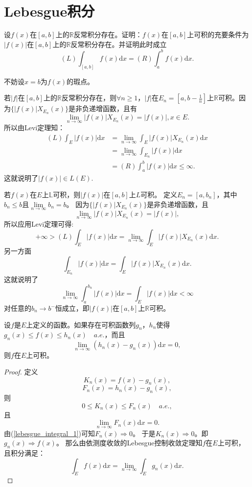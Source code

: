 \section{Lebesgue积分}

\begin{exercise}
设$f(x)$在$[a,b]$上的$\mathbb{R}$反常积分存在。证明：$f(x)$在$[a,b]$上可积的充要条件为$|f(x)|$在$[a,b]$上的$\mathbb{R}$反常积分存在。并证明此时成立$$(L)\int_{[a,b]}f(x)\mathrm{d}x=(R)\int_a^bf(x)\mathrm{d}x.$$


不妨设$x=b$为$f(x)$的瑕点。

若$|f|$在$[a,b]$上的$\mathbb{R}$反常积分存在，则$\forall n\geq1$，$|f|$在$E_n=[a,b-\frac{1}{n}]$上$\mathbb{R}$可积。因为$\{|f(x)|X_{E_n}(x)\}$是非负递增函数，且有$$\lim_{n\to\infty}|f(x)|X_{E_n}(x)=|f(x)|,x\in E.$$所以由Levi定理知：
\begin{align*}
(L)\int_E|f(x)|\mathrm{d}x&=\lim_{n\to\infty}\int_E|f(x)|X_{E_n}(x)\mathrm{d}x\\
&=\lim_{n\to\infty}\int_{E_n}|f(x)|\mathrm{d}x\\
&=(R)\int_a^b|f(x)|\mathrm{d}x
\leq\infty.
\end{align*}
这就说明了$|f(x)|\in L(E).$

若$f(x)$在$E$上$\mathbb{L}$可积，则$|f(x)|$在$[a,b]$上$L$可积。
定义$E_n=[a,b_n]$，其中$b_n\leq b$且$\lim\limits_{n\to\infty}b_n=b$。
因为$\{|f(x)|X_{E_n}(x)\}$是非负递增函数，且
$$\lim_{n\to\infty}|f(x)|X_{E_n}(x)=|f(x)|,$$
所以应用Levi定理可得:
$$+\infty>(L)\int_E|f(x)|\mathrm{d}x=\lim_{n\to\infty}\int_E|f(x)|X_{E_n}(x)\mathrm{d}x.$$
另一方面$$\int_{E_n}|f(x)|\mathrm{d}x=\int_E|f(x)|X_{E_n}(x)\mathrm{d}x.$$
这就说明了$$\lim_{n\to\infty}\int_a^{b_n}|f(x)|\mathrm{d}x=\int_E|f(x)|\mathrm{d}x<\infty$$
对任意的$b_n\to b^-$恒成立，即$|f(x)|$在$[a,b]$上$\mathbb{R}$可积。
\end{exercise}



\begin{exercise}
设$f$是$E$上定义的函数。如果存在可积函数列$g_n$，$h_n$使得$g_n(x)\leq f(x)\leq h_n(x)\quad a.e.$，而且
$$\lim_{n\to\infty}(h_n(x)-g_n(x))\mathrm{d}x=0,$$
则$f$在$E$上可积。
\end{exercise}

\begin{proof}
  定义$$K_n(x)=f(x)-g_n(x),$$
$$F_n(x)=h_n(x)-g_n(x),$$
则
$$0\leq K_n(x)\leq F_n(x)\quad a.e.,$$
且
\begin{equation}\label{lebesgue_integral_1}
\lim_{n\to\infty}F_n(x)\mathrm{d}x=0.
\end{equation}
由(\ref{lebesgue_integral_1})可知$F_n(x)\Rightarrow0$。
于是$K_n(x)\Rightarrow0$。即$g_n(x)\Rightarrow f(x)$。
那么由依测度收敛的Lebesgue控制收敛定理知$f$在$E$上可积，且积分满足：
$$\int_Ef(x)\mathrm{d}x=\lim_{n\to\infty}\int_Eg_n(x)\mathrm{d}x.$$
\end{proof}


